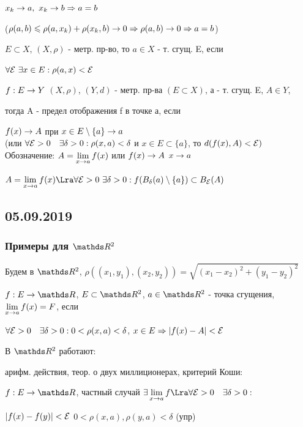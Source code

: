\documentclass[12pt, fleqn]{article}
\begin{document}
\begin{upr}
    $x_k \rightarrow a,\ x_k \rightarrow b \Rightarrow a=b$
    
    ($\rho(a,b) \leqslant \rho(a, x_k) + \rho(x_k,b) \rightarrow 0 \Rightarrow \rho (a,b) \rightarrow 0 \Rightarrow a=b$)
\end{upr}

\begin{definition}
    $E \subset X$, $(X, \rho)$ - метр. пр-во, то $a \in X$ - т. сгущ. E, если 
    
    $\forall \mathcal{E} \ \exists x \in E: \rho(a,x) < \mathcal{E}$
\end{definition}

\begin{definition}
    $f:E \rightarrow Y$ $(X, \rho)$, $(Y,d)$ - метр. пр-ва $(E \subset X)$, а - т. сгущ. E, $A \in Y$, 
    
    тогда A - предел отображения f в точке а, если 
    
    $f(x) \rightarrow A$ при $x \in E \setminus \{a\}\rightarrow a$\\
    (или $\forall \mathcal{E}>0 \quad \exists \delta>0: \rho(x,a)<\delta$ и $x \in E \subset \{a\}$, то $d(f(x),A) < \mathcal{E})$\\
    Обозначение: $A=\lim\limits_{x \rightarrow a} f(x)$ или $f(x) \rightarrow A$ $x \rightarrow a$
\end{definition}

\begin{remark}
    $A=\lim\limits_{x \ra a} f(x) \Lra \forall \E > 0 \ \e \delta>0: f(B_\delta(a) \setminus \{a\}) \subset B_\E (A)$
\end{remark}

\newpage
\subsection{05.09.2019}
\subsubsection{Примеры для $\R^2$}

Будем в $\R^2$, $\rho((x_1,y_1), (x_2,y_2)) = \sqrt{(x_1-x_2)^2 + (y_1-y_2)^2}$
\begin{definition}
    $f: E \ra \R$, $E \subset \R^2$, $a \in \R^2$ - точка сгущения, $\lim\limits_{x \rightarrow a} f(x) = F$, если 
    
    $\forall \mathcal{E}>0 \quad \exists \delta>0: 0<\rho(x,a)<\delta$, $x \in E \Rightarrow |f(x)-A|<\mathcal{E}$ 
\end{definition}
В $\R^2$ работают: 

арифм. действия, теор. о двух миллиционерах, критерий Коши:
\begin{definition}
    $f: E \ra \R$, частный случай $\e \lim\limits_{x \ra a} f \Lra \forall \E>0 \q \e \delta > 0:$
    
    $|f(x)-f(y)|<\mathcal{E}$ $0<\rho(x,a), \rho(y,a)<\delta$ (упр)
\end{definition}
\end{document}
